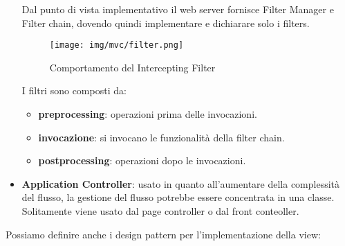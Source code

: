 \begin{itemize}
            Dal punto di vista implementativo il web server fornisce Filter Manager
            e Filter chain, dovendo quindi implementare e dichiarare solo i filters.
            \begin{figure}[!ht]
                  \centering
                  \texttt{[image: img/mvc/filter.png]}
                  \caption{Comportamento del Intercepting Filter}
            \end{figure}
            I filtri sono composti da:
            \begin{itemize}
                  \item \textbf{preprocessing}: operazioni prima delle invocazioni.
                  \item \textbf{invocazione}: si invocano le funzionalità della
                        filter chain.
                  \item \textbf{postprocessing}: operazioni dopo le invocazioni.
            \end{itemize}
      \item \textbf{Application Controller}: usato in quanto all'aumentare della
            complessità del flusso, la gestione del flusso potrebbe essere
            concentrata in una classe. Solitamente viene usato dal page controller
            o dal front conteoller.
\end{itemize}
Possiamo definire anche i design pattern per l'implementazione della view:
